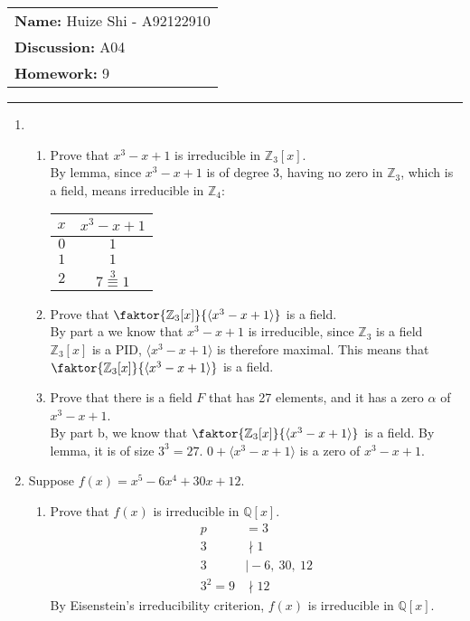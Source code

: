 \documentclass[12pt]{article}
\begin{document}
\null\hfill\begin{tabular}[t]{l@{}}
	\textbf{Name: }Huize Shi - A92122910 \\
	\textbf{Discussion: }A04 \\
	\textbf{Homework: }9
\end{tabular}
\noindent\rule{\textwidth}{0.5pt}

\begin{enumerate}
	\item
	\begin{enumerate}
		\item Prove that $x^3 - x + 1$ is irreducible in $\mathbb{Z}_3[x]$.\\
			By lemma, since $x^3 - x + 1$ is of degree 3, having no zero in
			$\mathbb{Z}_3$, which is a field, means irreducible in $\mathbb{Z}_4$:
			\begin{center}
				\begin{tabular}{c | c}
					$x$ & $x^3 - x + 1$\\
					\hline
					$0$ & $1$\\
					$1$ & $1$\\
					$2$ & $7\overset{3}{\equiv} 1$\\
				\end{tabular}
			\end{center}

		\item Prove that $\faktor{\mathbb{Z}_3[x]}{\langle x^3 - x + 1 \rangle}$ is
			a field.\\
			By part a we know that $x^3 - x + 1$ is irreducible, since $\mathbb{Z}_3$
			is a field $\mathbb{Z}_3[x]$ is a PID, $\langle x^3 - x + 1 \rangle$ is
			therefore maximal. This means that $\faktor{\mathbb{Z}_3[x]}{\langle x^3 -
			x + 1 \rangle}$ is a field.

		\item Prove that there is a field $F$ that has 27 elements, and it has a
			zero $\alpha$ of $x^3 - x + 1$.\\
			By part b, we know that $\faktor{\mathbb{Z}_3[x]}{\langle x^3 -
			x + 1 \rangle}$ is a field. By lemma, it is of size $3^3=27$. $0+\langle
			x^3 - x + 1 \rangle$ is a zero of $x^3 - x + 1$.

	\end{enumerate}

	\item Suppose $f(x) = x^5 - 6x^4 + 30x + 12$.
		\begin{enumerate}
			\item Prove that $f(x)$ is irreducible in $\mathbb{Q}[x]$.\\
				\begin{align*}
				p &= 3\\
				3 &\nmid 1\\
				3 &\mid -6,\ 30,\ 12\\
				3^2 = 9 &\nmid 12
				\end{align*}
				By Eisenstein's irreducibility criterion, $f(x)$ is irreducible in
				$\mathbb{Q}[x]$.


\end{enumerate}
\end{enumerate}
\end{document}
